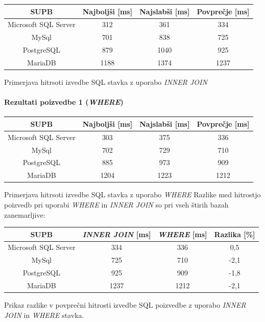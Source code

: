 \documentclass[a4paper,11pt]{report}
\begin{document}
\begin{center}
   \begin{tabular}{||c|c|c|c||}
      \hline
      \textbf{SUPB} & \textbf{Najboljši [ms]} & \textbf{Najslabši [ms]} & \textbf{Povprečje [ms]}\\
      \hline
      \hline
      Microsoft SQL Server & 312 & 361 & 334 \\
      MySql & 701 & 838 & 725 \\
      PostgreSQL & 879 & 1040 & 925\\
      MariaDB & 1188 & 1374 & 1237 \\
      \hline
   \end{tabular}
\end{center}
Primerjava hitrsoti izvedbe SQL stavka z uporabo \textit{INNER JOIN}

\paragraph{Rezultati poizvedbe 1 (\textit{WHERE})}
\begin{center}
   \begin{tabular}{||c|c|c|c||}
      \hline
      \textbf{SUPB} & \textbf{Najboljši [ms]} & \textbf{Najslabši [ms]} & \textbf{Povprečje [ms]}\\
      \hline
      \hline
      Microsoft SQL Server & 303 & 375 & 336 \\
      MySql & 702 & 729 & 710 \\
      PostgreSQL & 885 & 973 & 909\\
      MariaDB & 1204 & 1223 & 1212 \\
      \hline
   \end{tabular}
\end{center}
Primerjava hitrsoti izvedbe SQL stavka z uporabo \textit{WHERE}
\pagebreak
Razlike med hitrostjo poizvedb pri uporabi \textit{WHERE} in \textit{INNER JOIN} so pri vseh štirih bazah zanemarljive:

\begin{center}
   \begin{tabular}{||c|c|c|c||}
      \hline
      \textbf{SUPB} & \textbf{\textit{INNER JOIN} [ms]} & \textbf{\textit{WHERE} [ms]} & \textbf{Razlika [\%]}\\
      \hline
      \hline
      Microsoft SQL Server & 334 & 336 & 0,5 \\
      MySql & 725 & 710 & -2,1 \\
      PostgreSQL & 925 & 909 & -1,8\\
      MariaDB & 1237 & 1212 & -2,1 \\
      \hline
   \end{tabular}
\end{center}
Prikaz razlike v povprečni hitrosti izvedbe SQL poizvedbe z uporabo \textit{INNER JOIN} in \textit{WHERE} stavka.
\end{document}
